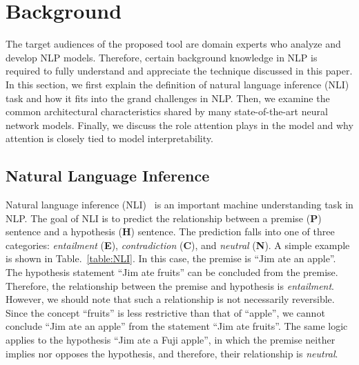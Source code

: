\section{Background}
The target audiences of the proposed tool are domain experts who analyze and develop NLP models. Therefore, certain background knowledge in NLP is required to fully understand and appreciate the technique discussed in this paper. In this section, we first explain the definition of natural language inference (NLI) task and how it fits into the grand challenges in NLP. Then, we examine the common architectural characteristics shared by many state-of-the-art neural network models. Finally, we discuss the role attention plays in the model and why attention is closely tied to model interpretability.

\subsection{Natural Language Inference}
\label{sec:languageInference}
Natural language inference (NLI)~\cite{DaganRothSammons2013} is an important machine understanding task in NLP.
The goal of NLI is to predict the relationship between a premise (\textbf{P}) sentence and a hypothesis (\textbf{H}) sentence. 
The prediction falls into one of three categories: \emph{entailment} (\textbf{E}), \emph{contradiction} (\textbf{C}), and \emph{neutral} (\textbf{N}).
A simple example is shown in Table.~\ref{table:NLI}.
In this case, the premise is ``Jim ate an apple''. 
The hypothesis statement ``Jim ate fruits'' can be concluded from the premise. Therefore, the relationship between the premise and hypothesis is \emph{entailment}. However, we should note that such a relationship is not necessarily reversible. Since the concept ``fruits'' is less restrictive than that of ``apple'', we cannot conclude ``Jim ate an apple'' from the statement ``Jim ate fruits''. The same logic applies to the hypothesis ``Jim ate a Fuji apple'', in which the premise neither implies nor opposes the hypothesis, and therefore, their relationship is \emph{neutral}.

